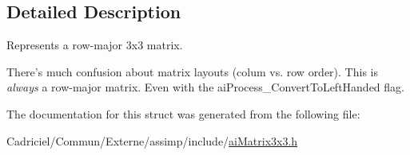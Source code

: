 \subsection{Detailed Description}
Represents a row-\/major 3x3 matrix. 

There's much confusion about matrix layouts (colum vs. row order). This is {\itshape always} a row-\/major matrix. Even with the ai\-Process\-\_\-\-Convert\-To\-Left\-Handed flag. 

The documentation for this struct was generated from the following file\-:\begin{DoxyCompactItemize}
\item 
Cadriciel/\-Commun/\-Externe/assimp/include/\hyperlink{ai_matrix3x3_8h}{ai\-Matrix3x3.\-h}\end{DoxyCompactItemize}
